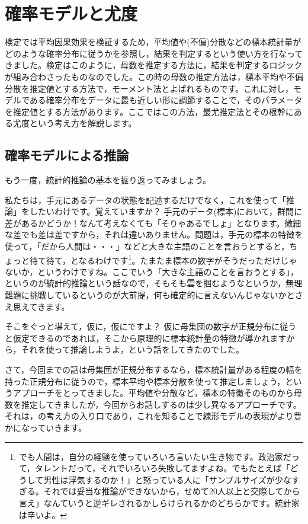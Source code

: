 \documentclass{ltjsbook}
\begin{document}
\chapter{確率モデルと尤度}
\label{ch23_probabilistic_model}
検定では平均因果効果を検証するため，平均値や(不偏)分散などの標本統計量がどのような確率分布に従うかを参照し，結果を判定するという使い方を行なってきました。検定はこのように，母数を推定する方法に，結果を判定するロジックが組み合わさったものなのでした。この時の母数の推定方法は，標本平均や不偏分散を推定値とする方法で，モーメント法とよばれるものです。これに対し，モデルである確率分布をデータに最も近しい形に調節することで，そのパラメータを推定値とする方法があります。ここではこの方法，最尤推定法とその根幹にある尤度という考え方を解説します。
\section{確率モデルによる推論}
もう一度，統計的推論の基本を振り返ってみましょう。

私たちは，手元にあるデータの状態を記述するだけでなく，これを使って「推論」をしたいわけです。覚えていますか？ 手元のデータ(標本)において，群間に差があるかどうか！なんて考えなくても「そりゃあるでしょ」となります。微細な差でも差は差ですから，それは違いありません。問題は，手元の標本の特徴を使って，「だから人間は・・・」などと大きな主語のことを言おうとすると，ちょっと待て待て，となるわけです\footnote{でも人間は，自分の経験を使っていろいろ言いたい生き物です。政治家だって，タレントだって，それでいろいろ失敗してますよね。でもたとえば「どうして男性は浮気するのか！」と怒っている人に「サンプルサイズが少なすぎる。それでは妥当な推論ができないから，せめて20人以上と交際してから言え」なんていうと逆ギレされるかしらけられるかのどちらかです。統計家は辛いよ。}。たまたま標本の数字がそうだっただけじゃないか，というわけですね。ここでいう「大きな主語のことを言おうとする」，というのが統計的推論という話なので，そもそも雲を掴むようなというか，無理難題に挑戦しているというのが大前提，何も確定的に言えないんじゃないかとさえ思えてきます。

そこをぐっと堪えて，仮に，仮にですよ？ 仮に母集団の数字が正規分布に従うと仮定できるのであれば，そこから原理的に標本統計量の特徴が導かれますから，それを使って推論しようよ，という話をしてきたのでした。

さて，今回までの話は母集団が正規分布するなら，標本統計量がある程度の幅を持った正規分布に従うので，標本平均や標本分散を使って推定しましょう，というアプローチをとってきました。平均値や分散など，標本の特徴そのものから母数を推定してきましたが，今回からお話しするのは少し異なるアプローチです。それは，の考え方の入り口であり，これを知ることで線形モデルの表現がより豊かになっていきます。
\end{document}
